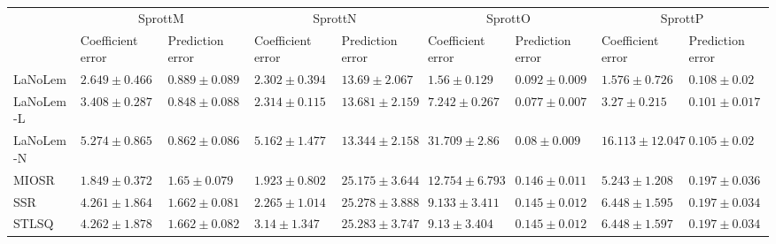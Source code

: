 \begin{table*}
{\begin{tabular}{lllllllll}
 & \multicolumn{2}{c}{SprottM} & \multicolumn{2}{c}{SprottN} & \multicolumn{2}{c}{SprottO} & \multicolumn{2}{c}{SprottP} \\
 & Coefficient error & Prediction error & Coefficient error & Prediction error & Coefficient error & Prediction error & Coefficient error & Prediction error \\
\midrule
LaNoLem & $2.649\pm 0.466$ & $0.889\pm 0.089$ & $2.302\pm 0.394$ & $13.69\pm 2.067$ & $\mathbf{1.56}\pm 0.129$ & $0.092\pm 0.009$ & $\mathbf{1.576}\pm 0.726$ & $0.108\pm 0.02$ \\
LaNoLem-L & $3.408\pm 0.287$ & $\mathbf{0.848}\pm 0.088$ & $2.314\pm 0.115$ & $13.681\pm 2.159$ & $7.242\pm 0.267$ & $\mathbf{0.077}\pm 0.007$ & $3.27\pm 0.215$ & $\mathbf{0.101}\pm 0.017$ \\
LaNoLem-N & $5.274\pm 0.865$ & $0.862\pm 0.086$ & $5.162\pm 1.477$ & $\mathbf{13.344}\pm 2.158$ & $31.709\pm 2.86$ & $0.08\pm 0.009$ & $16.113\pm 12.047$ & $0.105\pm 0.02$ \\
MIOSR & $\mathbf{1.849}\pm 0.372$ & $1.65\pm 0.079$ & $\mathbf{1.923}\pm 0.802$ & $25.175\pm 3.644$ & $12.754\pm 6.793$ & $0.146\pm 0.011$ & $5.243\pm 1.208$ & $0.197\pm 0.036$ \\
SSR & $4.261\pm 1.864$ & $1.662\pm 0.081$ & $2.265\pm 1.014$ & $25.278\pm 3.888$ & $9.133\pm 3.411$ & $0.145\pm 0.012$ & $6.448\pm 1.595$ & $0.197\pm 0.034$ \\
STLSQ & $4.262\pm 1.878$ & $1.662\pm 0.082$ & $3.14\pm 1.347$ & $25.283\pm 3.747$ & $9.13\pm 3.404$ & $0.145\pm 0.012$ & $6.448\pm 1.597$ & $0.197\pm 0.034$ \\

\midrule


\end{tabular}}
\end{table*}
